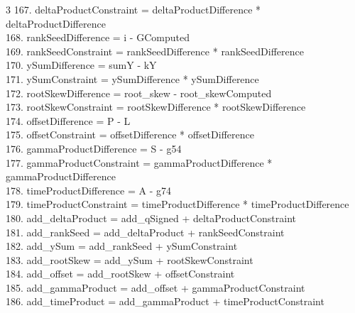 \documentclass[10pt]{article}
\begin{document}
\begin{multicols}{3}
167. deltaProductConstraint = deltaProductDifference * deltaProductDifference\\
168. rankSeedDifference = i - GComputed\\
169. rankSeedConstraint = rankSeedDifference * rankSeedDifference\\
170. ySumDifference = sumY - kY\\
171. ySumConstraint = ySumDifference * ySumDifference\\
172. rootSkewDifference = root\_skew - root\_skewComputed\\
173. rootSkewConstraint = rootSkewDifference * rootSkewDifference\\
174. offsetDifference = P - L\\
175. offsetConstraint = offsetDifference * offsetDifference\\
176. gammaProductDifference = S - g54\\
177. gammaProductConstraint = gammaProductDifference * gammaProductDifference\\
178. timeProductDifference = A - g74\\
179. timeProductConstraint = timeProductDifference * timeProductDifference\\
180. add\_deltaProduct = add\_qSigned + deltaProductConstraint\\
181. add\_rankSeed = add\_deltaProduct + rankSeedConstraint\\
182. add\_ySum = add\_rankSeed + ySumConstraint\\
183. add\_rootSkew = add\_ySum + rootSkewConstraint\\
184. add\_offset = add\_rootSkew + offsetConstraint\\
185. add\_gammaProduct = add\_offset + gammaProductConstraint\\
186. add\_timeProduct = add\_gammaProduct + timeProductConstraint\\
\end{multicols}
\end{document}
